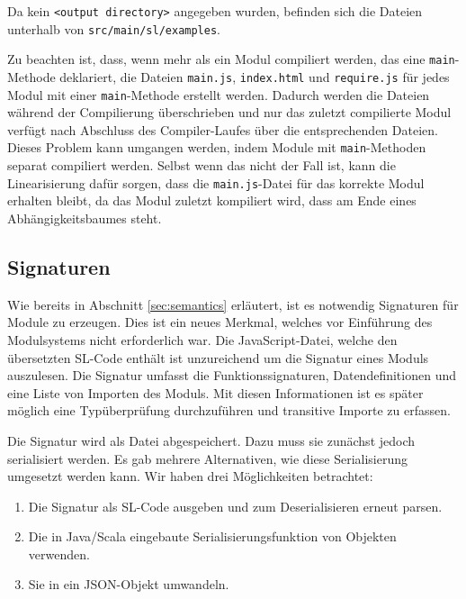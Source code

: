 \documentclass[runningheads]{llncs}
\begin{document}
\begin{description}
\begin{description}
        Da kein \texttt{<output directory>} angegeben wurden, befinden
        sich die Dateien unterhalb von \texttt{src/main/sl/examples}.
        
        Zu beachten ist, dass, wenn mehr als ein Modul compiliert
        werden, das eine \texttt{main}-Methode deklariert, die Dateien
        \texttt{main.js}, \texttt{index.html} und \texttt{require.js}
        für jedes Modul mit einer \texttt{main}-Methode erstellt
        werden. Dadurch werden die Dateien während der Compilierung
        überschrieben und nur das zuletzt compilierte Modul verfügt
        nach Abschluss des Compiler-Laufes über die entsprechenden
        Dateien. Dieses Problem kann umgangen werden, indem Module mit
        \texttt{main}-Methoden separat compiliert werden. Selbst wenn
        das nicht der Fall ist, kann die Linearisierung dafür sorgen,
        dass die \texttt{main.js}-Datei für das korrekte Modul
        erhalten bleibt, da das Modul zuletzt kompiliert wird, dass
        am Ende eines Abhängigkeitsbaumes steht.
    \end{description}
\end{description}

\subsection{Signaturen}
\label{sec:compSig}

Wie bereits in Abschnitt \ref{sec:semantics} erläutert, ist es notwendig Signaturen für Module zu erzeugen. Dies ist ein neues Merkmal, welches vor Einführung des Modulsystems nicht erforderlich war. Die JavaScript-Datei, welche den übersetzten SL-Code enthält ist unzureichend um die Signatur eines Moduls auszulesen. Die Signatur umfasst die Funktionssignaturen, Datendefinitionen und eine Liste von Importen des Moduls. Mit diesen Informationen ist es später möglich eine Typüberprüfung durchzuführen und transitive Importe zu erfassen.

Die Signatur wird als Datei abgespeichert. Dazu muss sie zunächst jedoch serialisiert werden. Es gab mehrere Alternativen, wie diese Serialisierung umgesetzt werden kann. Wir haben drei Möglichkeiten betrachtet:

\begin{enumerate}
 \item Die Signatur als SL-Code ausgeben und zum Deserialisieren erneut parsen.
 \item Die in Java/Scala eingebaute Serialisierungsfunktion von Objekten verwenden.
 \item Sie in ein JSON-Objekt umwandeln.
\end{enumerate}
\end{document}
